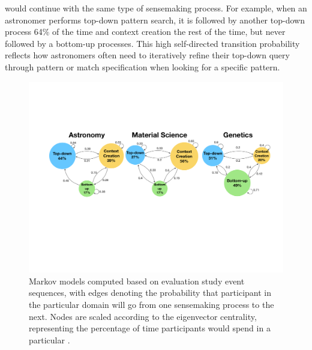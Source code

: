 would continue with the same type of sensemaking process.
For example, when an astronomer performs top-down pattern search,
it is followed by another top-down process 64\% of the time and context creation the rest of the time,
but never followed by a bottom-up processes.
This high self-directed transition probability
reflects how astronomers often need to iteratively
refine their top-down query through pattern
or match specification when looking for a specific pattern. %
\begin{figure}[ht!]
  \centering
  \includegraphics[width=0.6\linewidth]{figures/markov_transition.pdf}
  \caption{Markov models computed based on evaluation study event sequences, with edges denoting the probability that participant in the particular domain will go from one sensemaking process to the next. Nodes are scaled according to the eigenvector centrality, representing the percentage of time participants would spend in a particular .}\label{fig:transition}
  \vspace*{-15pt}
\end{figure}
